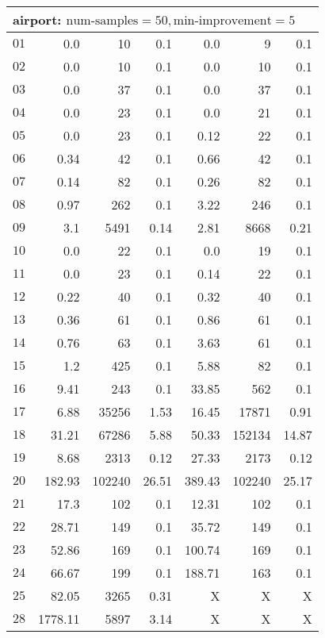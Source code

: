 \begin{longtable}{|c||r|r|r||r|r|r|}
\multicolumn{7}{|l|}{airport: $\text{num-samples}=50,\text{min-improvement}=5$}\\\hline
$01$ & 0.0 & 10 & 0.1 &0.0 & 9 & 0.1 \\\hline
$02$ & 0.0 & 10 & 0.1 &0.0 & 10 & 0.1 \\\hline
$03$ & 0.0 & 37 & 0.1 &0.0 & 37 & 0.1 \\\hline
$04$ & 0.0 & 23 & 0.1 &0.0 & 21 & 0.1 \\\hline
$05$ & 0.0 & 23 & 0.1 &0.12 & 22 & 0.1 \\\hline
$06$ & 0.34 & 42 & 0.1 &0.66 & 42 & 0.1 \\\hline
$07$ & 0.14 & 82 & 0.1 &0.26 & 82 & 0.1 \\\hline
$08$ & 0.97 & 262 & 0.1 &3.22 & 246 & 0.1 \\\hline
$09$ & 3.1 & 5491 & 0.14 &2.81 & 8668 & 0.21 \\\hline
$10$ & 0.0 & 22 & 0.1 &0.0 & 19 & 0.1 \\\hline
$11$ & 0.0 & 23 & 0.1 &0.14 & 22 & 0.1 \\\hline
$12$ & 0.22 & 40 & 0.1 &0.32 & 40 & 0.1 \\\hline
$13$ & 0.36 & 61 & 0.1 &0.86 & 61 & 0.1 \\\hline
$14$ & 0.76 & 63 & 0.1 &3.63 & 61 & 0.1 \\\hline
$15$ & 1.2 & 425 & 0.1 &5.88 & 82 & 0.1 \\\hline
$16$ & 9.41 & 243 & 0.1 &33.85 & 562 & 0.1 \\\hline
$17$ & 6.88 & 35256 & 1.53 &16.45 & 17871 & 0.91 \\\hline
$18$ & 31.21 & 67286 & 5.88 &50.33 & 152134 & 14.87 \\\hline
$19$ & 8.68 & 2313 & 0.12 &27.33 & 2173 & 0.12 \\\hline
$20$ & 182.93 & 102240 & 26.51 &389.43 & 102240 & 25.17 \\\hline
$21$ & 17.3 & 102 & 0.1 &12.31 & 102 & 0.1 \\\hline
$22$ & 28.71 & 149 & 0.1 &35.72 & 149 & 0.1 \\\hline
$23$ & 52.86 & 169 & 0.1 &100.74 & 169 & 0.1 \\\hline
$24$ & 66.67 & 199 & 0.1 &188.71 & 163 & 0.1 \\\hline
$25$ & 82.05 & 3265 & 0.31 &X & X & X \\\hline
$28$ & 1778.11 & 5897 & 3.14 &X & X & X \\\hline

\end{longtable}
